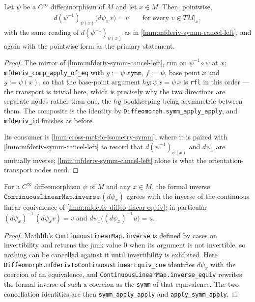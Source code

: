 \begin{lemma}
    \label{lmm:mfderiv-symm-cancel-right}
    Let $\psi$ be a $C^\infty$ diffeomorphism of $M$ and let $x \in M$. Then, pointwise,
    \begin{align}
        d(\psi^{-1})_{\psi(x)}\big(d\psi_x\,v\big) = v \qquad \text{for every } v \in TM|_x,
    \end{align}
    with the same reading of $d(\psi^{-1})_{\psi(x)}$ as in \ref{lmm:mfderiv-symm-cancel-left}, and again with the pointwise form as the primary statement.
\end{lemma}
\begin{proof}
    The mirror of \ref{lmm:mfderiv-symm-cancel-left}, run on $\psi^{-1} \circ \psi$ at $x$: \texttt{mfderiv\_comp\_apply\_of\_eq} with $g := \psi.\mathtt{symm}$, $f := \psi$, base point $x$ and $y := \psi(x)$, so that the base-point argument $hy : \psi\,x = \psi\,x$ is \texttt{rfl} in this order --- the transport is trivial here, which is precisely why the two directions are separate nodes rather than one, the $hy$ bookkeeping being asymmetric between them. The composite is the identity by \texttt{Diffeomorph.symm\_apply\_apply}, and \texttt{mfderiv\_id} finishes as before.

    Its consumer is \ref{lmm:cross-metric-isometry-symm}, where it is paired with \ref{lmm:mfderiv-symm-cancel-left} to record that $d(\psi^{-1})_{\psi(x)}$ and $d\psi_x$ are mutually inverse; \ref{lmm:mfderiv-symm-cancel-left} alone is what the orientation-transport nodes need.
\end{proof}

\begin{lemma}
    \label{lmm:mfderiv-inverse-eq-symm}
    For a $C^\infty$ diffeomorphism $\psi$ of $M$ and any $x \in M$, the formal inverse $\mathtt{ContinuousLinearMap.inverse}\,(d\psi_x)$ agrees with the inverse of the continuous linear equivalence of \ref{lmm:mfderiv-diffeo-linear-equiv}; in particular $(d\psi_x)^{-1}\,(d\psi_x v) = v$ and $d\psi_x\big((d\psi_x)^{-1}u\big) = u$.
\end{lemma}
\begin{proof}
    Mathlib's \texttt{ContinuousLinearMap.inverse} is defined by cases on invertibility and returns the junk value $0$ when its argument is not invertible, so nothing can be cancelled against it until invertibility is exhibited. Here \texttt{Diffeomorph.mfderivToContinuousLinearEquiv\_coe} identifies $d\psi_x$ with the coercion of an equivalence, and \texttt{ContinuousLinearMap.inverse\_equiv} rewrites the formal inverse of such a coercion as the \texttt{symm} of that equivalence. The two cancellation identities are then \texttt{symm\_apply\_apply} and \texttt{apply\_symm\_apply}.
\end{proof}

